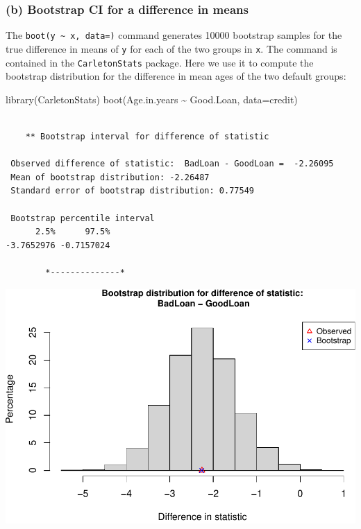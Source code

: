 \documentclass[
]{book}
\newenvironment{Shaded}{\begin{snugshade}}{\end{snugshade}}
\newcommand{\AttributeTok}[1]{\textcolor[rgb]{0.77,0.63,0.00}{#1}}
\newcommand{\FunctionTok}[1]{\textcolor[rgb]{0.00,0.00,0.00}{#1}}
\newcommand{\NormalTok}[1]{#1}
\newcommand{\SpecialCharTok}[1]{\textcolor[rgb]{0.00,0.00,0.00}{#1}}
\begin{document}
\hypertarget{b-bootstrap-ci-for-a-difference-in-means}{%
\subsubsection{(b) Bootstrap CI for a difference in means}\label{b-bootstrap-ci-for-a-difference-in-means}}

The \texttt{boot(y\ \textasciitilde{}\ x,\ data=)} command generates 10000 bootstrap samples for the true difference in means of \texttt{y} for each of the two groups in \texttt{x}. The command is contained in the \texttt{CarletonStats} package. Here we use it to compute the bootstrap distribution for the difference in mean ages of the two default groups:

\begin{Shaded}
\begin{Highlighting}[]
\FunctionTok{library}\NormalTok{(CarletonStats)}
\FunctionTok{boot}\NormalTok{(Age.in.years }\SpecialCharTok{\textasciitilde{}}\NormalTok{ Good.Loan, }\AttributeTok{data=}\NormalTok{credit)}
\end{Highlighting}
\end{Shaded}

\begin{verbatim}

    ** Bootstrap interval for difference of statistic

 Observed difference of statistic:  BadLoan - GoodLoan =  -2.26095 
 Mean of bootstrap distribution: -2.26487 
 Standard error of bootstrap distribution: 0.77549 

 Bootstrap percentile interval
      2.5%      97.5% 
-3.7652976 -0.7157024 

        *--------------*
\end{verbatim}

\includegraphics[width=1\linewidth]{Class_Activity_8_files/figure-latex/unnamed-chunk-5-1}
\end{document}
